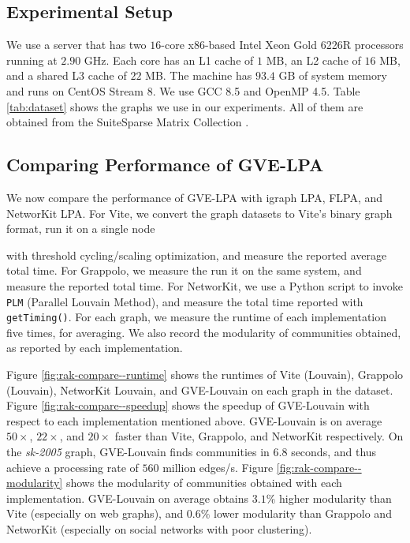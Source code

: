\subsection{Experimental Setup}
\label{sec:setup}

We use a server that has two $16$-core x86-based Intel Xeon Gold 6226R processors running at $2.90$ GHz. Each core has an L1 cache of $1$ MB, an L2 cache of $16$ MB, and a shared L3 cache of $22$ MB. The machine has $93.4$ GB of system memory and runs on CentOS Stream 8. We use GCC 8.5 and OpenMP 4.5. Table \ref{tab:dataset} shows the graphs we use in our experiments. All of them are obtained from the SuiteSparse Matrix Collection \cite{suite19}.







\subsection{Comparing Performance of GVE-LPA}

We now compare the performance of GVE-LPA with igraph LPA, FLPA, and NetworKit LPA. For Vite, we convert the graph datasets to Vite's binary graph format, run it on a single node with threshold cycling/scaling optimization, and measure the reported average total time. For Grappolo, we measure the run it on the same system, and measure the reported total time. For NetworKit, we use a Python script to invoke \texttt{PLM} (Parallel Louvain Method), and measure the total time reported with \texttt{getTiming()}. For each graph, we measure the runtime of each implementation five times, for averaging. We also record the modularity of communities obtained, as reported by each implementation.

Figure \ref{fig:rak-compare--runtime} shows the runtimes of Vite (Louvain), Grappolo (Louvain), NetworKit Louvain, and GVE-Louvain on each graph in the dataset. Figure \ref{fig:rak-compare--speedup} shows the speedup of GVE-Louvain with respect to each implementation mentioned above. GVE-Louvain is on average $50\times$, $22\times$, and $20\times$ faster than Vite, Grappolo, and NetworKit respectively. On the \textit{sk-2005} graph, GVE-Louvain finds communities in $6.8$ seconds, and thus achieve a processing rate of $560$ million edges/s. Figure \ref{fig:rak-compare--modularity} shows the modularity of communities obtained with each implementation. GVE-Louvain on average obtains $3.1\%$ higher modularity than Vite (especially on web graphs), and $0.6\%$ lower modularity than Grappolo and NetworKit (especially on social networks with poor clustering).

